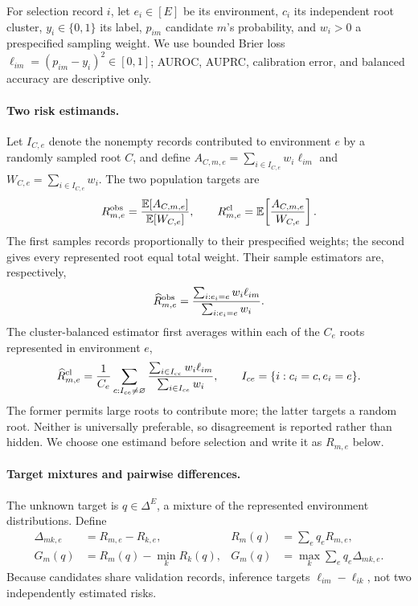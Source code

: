 \documentclass{article}
\begin{document}
For selection record $i$, let $e_i\in[E]$ be its environment, $c_i$ its independent root cluster, $y_i\in\{0,1\}$ its label, $p_{im}$ candidate $m$'s probability, and $w_i>0$ a prespecified sampling weight.  We use bounded Brier loss
$\ell_{im}=(p_{im}-y_i)^2\in[0,1]$; AUROC, AUPRC, calibration error, and balanced accuracy are descriptive only.

\paragraph{Two risk estimands.}
Let $I_{C,e}$ denote the nonempty records contributed to environment $e$ by a randomly sampled root $C$, and define $A_{C,m,e}=\sum_{i\in I_{C,e}}w_i\ell_{im}$ and $W_{C,e}=\sum_{i\in I_{C,e}}w_i$.  The two population targets are
\begin{equation}
R^{\rm obs}_{m,e}=\frac{\mathbb E[A_{C,m,e}]}{\mathbb E[W_{C,e}]},
\qquad
R^{\rm cl}_{m,e}=\mathbb E\!\left[\frac{A_{C,m,e}}{W_{C,e}}\right].
\label{eq:estimands}
\end{equation}
The first samples records proportionally to their prespecified weights; the second gives every represented root equal total weight.  Their sample estimators are, respectively,
\begin{equation}
\widehat R^{\rm obs}_{m,e}=
\frac{\sum_{i:e_i=e}w_i\ell_{im}}{\sum_{i:e_i=e}w_i}.
\label{eq:obsrisk}
\end{equation}
The cluster-balanced estimator first averages within each of the $C_e$ roots represented in environment $e$,
\begin{equation}
\widehat R^{\rm cl}_{m,e}=\frac{1}{C_e}\sum_{c:I_{ce}\ne\varnothing}
\frac{\sum_{i\in I_{ce}}w_i\ell_{im}}{\sum_{i\in I_{ce}}w_i},
\qquad I_{ce}=\{i:c_i=c,e_i=e\}.
\label{eq:clrisk}
\end{equation}
The former permits large roots to contribute more; the latter targets a random root.  Neither is universally preferable, so disagreement is reported rather than hidden.  We choose one estimand before selection and write it as $R_{m,e}$ below.

\paragraph{Target mixtures and pairwise differences.}
The unknown target is $q\in\Delta^E$, a mixture of the represented environment distributions.  Define
\begin{equation}
\begin{aligned}
\Delta_{mk,e}&=R_{m,e}-R_{k,e}, &
R_m(q)&=\sum_e q_eR_{m,e},\\
G_m(q)&=R_m(q)-\min_kR_k(q), &
G_m(q)&=\max_k\sum_eq_e\Delta_{mk,e}.
\end{aligned}
\label{eq:regret}
\end{equation}
Because candidates share validation records, inference targets $\ell_{im}-\ell_{ik}$, not two independently estimated risks.
\end{document}

